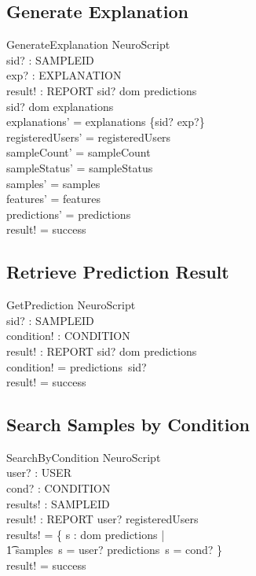 \documentclass[12pt,a4paper]{article}
\begin{document}
\subsection{Generate Explanation}

\begin{schema}{GenerateExplanation}
\Delta NeuroScript \\
sid? : SAMPLEID \\
exp? : EXPLANATION \\
result! : REPORT
\where
sid? \in dom predictions \\
sid? \notin dom explanations \\
explanations' = explanations \cup \{sid? \mapsto exp?\} \\
registeredUsers' = registeredUsers \\
sampleCount' = sampleCount \\
sampleStatus' = sampleStatus \\
samples' = samples \\
features' = features \\
predictions' = predictions \\
result! = success
\end{schema}

\subsection{Retrieve Prediction Result}

\begin{schema}{GetPrediction}
\Xi NeuroScript \\
sid? : SAMPLEID \\
condition! : CONDITION \\
result! : REPORT
\where
sid? \in dom predictions \\
condition! = predictions~sid? \\
result! = success
\end{schema}

\subsection{Search Samples by Condition}

\begin{schema}{SearchByCondition}
\Xi NeuroScript \\
user? : USER \\
cond? : CONDITION \\
results! : \power SAMPLEID \\
result! : REPORT
\where
user? \in registeredUsers \\
results! = \{ s : dom predictions | \\
\t1 samples~s = user? \land predictions~s = cond? \} \\
result! = success
\end{schema}
\end{document}
